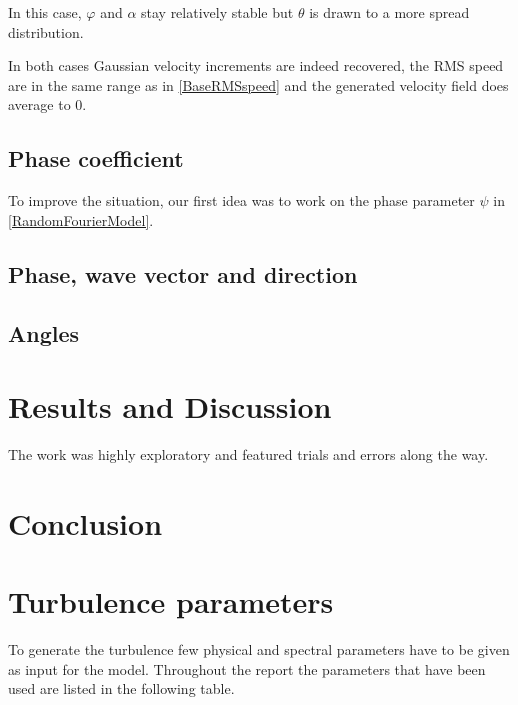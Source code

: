 \documentclass[a4paper,12pt]{article}
\theoremstyle{definition}
\begin{document}
In this case, $\varphi$ and $\alpha$ stay relatively stable but $\theta$ is drawn to a more spread distribution. 

\bigskip
In both cases Gaussian velocity increments are indeed recovered, the RMS speed are in the same range as in \ref{BaseRMSspeed} and the generated velocity field does average to 0.

\subsection{Phase coefficient}
To improve the situation, our first idea was to work on the phase parameter $\psi$ in \ref{RandomFourierModel}. 


\subsection{Phase, wave vector and direction}

\subsection{Angles}


\section{Results and Discussion}
The work was highly exploratory and featured trials and errors along the way.

\section{Conclusion}

\appendix

\section{Turbulence parameters}
To generate the turbulence few physical and spectral parameters have to be given as input for the model. Throughout the report the parameters that have been used are listed in the following table. 
\end{document}
